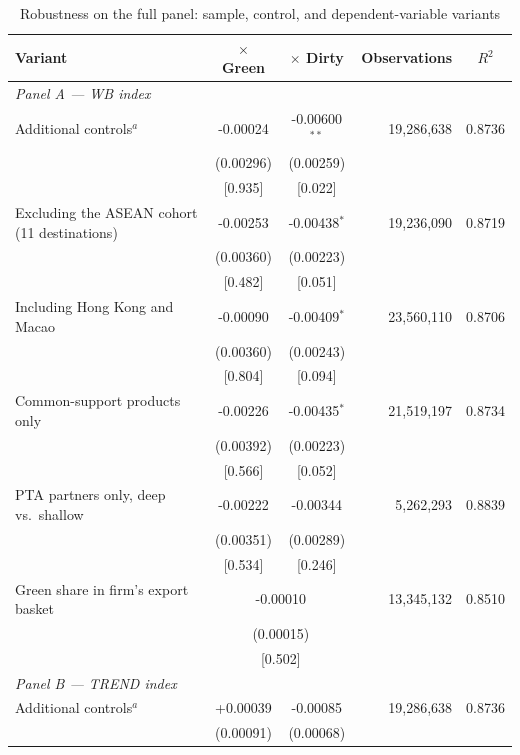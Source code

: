\begin{table}[htbp]
\centering
\scriptsize
\renewcommand{\arraystretch}{0.9}
\setlength{\tabcolsep}{4pt}
\caption{Robustness on the full panel: sample, control, and dependent-variable variants}
\label{tab:robust-full}
\begin{threeparttable}
\begin{tabular}{lccrc}
\toprule
Variant & $\times$ Green & $\times$ Dirty & Observations & $R^2$ \\
\midrule
\multicolumn{5}{l}{\textit{Panel A --- WB index}} \\
\addlinespace
Additional controls$^{a}$ & -0.00024 & -0.00600$^{**}$ & 19,286,638 & 0.8736 \\
 & (0.00296) & (0.00259) & & \\
 & [0.935] & [0.022] & & \\
\addlinespace
Excluding the ASEAN cohort (11 destinations) & -0.00253 & -0.00438$^{*}$ & 19,236,090 & 0.8719 \\
 & (0.00360) & (0.00223) & & \\
 & [0.482] & [0.051] & & \\
\addlinespace
Including Hong Kong and Macao & -0.00090 & -0.00409$^{*}$ & 23,560,110 & 0.8706 \\
 & (0.00360) & (0.00243) & & \\
 & [0.804] & [0.094] & & \\
\addlinespace
Common-support products only & -0.00226 & -0.00435$^{*}$ & 21,519,197 & 0.8734 \\
 & (0.00392) & (0.00223) & & \\
 & [0.566] & [0.052] & & \\
\addlinespace
PTA partners only, deep vs.\ shallow & -0.00222 & -0.00344 & 5,262,293 & 0.8839 \\
 & (0.00351) & (0.00289) & & \\
 & [0.534] & [0.246] & & \\
\addlinespace
Green share in firm's export basket & \multicolumn{2}{c}{-0.00010} & 13,345,132 & 0.8510 \\
 & \multicolumn{2}{c}{(0.00015)} & & \\
 & \multicolumn{2}{c}{[0.502]} & & \\
\midrule
\multicolumn{5}{l}{\textit{Panel B --- TREND index}} \\
\addlinespace
Additional controls$^{a}$ & +0.00039 & -0.00085 & 19,286,638 & 0.8736 \\
 & (0.00091) & (0.00068) & & \\

\end{tabular}
\end{threeparttable}
\end{table}
